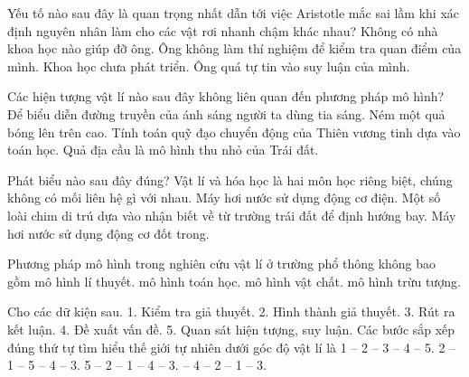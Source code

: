 \begin{ex}
Yếu tố nào sau đây là quan trọng nhất dẫn tới việc Aristotle mắc sai lầm khi xác định nguyên nhân làm cho các vật rơi nhanh chậm khác nhau?
\choice
{Không có nhà khoa học nào giúp đỡ ông.}
{\True Ông không làm thí nghiệm để kiểm tra quan điểm của mình.}
{Khoa học chưa phát triển.}
{Ông quá tự tin vào suy luận của mình.}
\end{ex}

\begin{ex}
Các hiện tượng vật lí nào sau đây không liên quan đến phương pháp mô hình?
\choice
{Để biểu diễn đường truyền của ánh sáng người ta dùng tia sáng.}
{\True Ném một quả bóng lên trên cao.}
{Tính toán quỹ đạo chuyển động của Thiên vương tinh dựa vào toán học.}
{Quả địa cầu là mô hình thu nhỏ của Trái đất.}
\end{ex}

\begin{ex}
Phát biểu nào sau đây đúng?
\choice
{Vật lí và hóa học là hai môn học riêng biệt, chúng không có mối liên hệ gì với nhau.}
{Máy hơi nước sử dụng động cơ điện.}
{\True Một số loài chim di trú dựa vào nhận biết về từ trường trái đất để định hướng bay.}
{Máy hơi nước sử dụng động cơ đốt trong.}
\end{ex}

\begin{ex}
Phương pháp mô hình trong nghiên cứu vật lí ở trường phổ thông không bao gồm
\choice
{mô hình lí thuyết.}
{mô hình toán học.}
{mô hình vật chất.}
{\True mô hình trừu tượng.}
\end{ex}

\begin{ex}
Cho các dữ kiện sau.
1. Kiểm tra giả thuyết. 	2. Hình thành giả thuyết. 	3. Rút ra kết luận.
4. Đề xuất vấn đề. 	5. Quan sát hiện tượng, suy luận.
Các bước sắp xếp đúng thứ tự tìm hiểu thế giới tự nhiên dưới góc độ vật lí là
\choice
{1 – 2 – 3 – 4 – 5.}
{2 – 1 – 5 – 4 – 3.}
{5 – 2 – 1 – 4 – 3.}
{ – 4 – 2 – 1 – 3.}
\end{ex}

